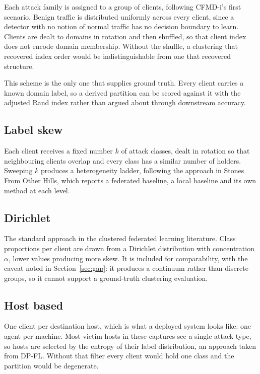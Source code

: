 Each attack family is assigned to a group of clients, following CFMD-i's first
scenario. Benign traffic is distributed uniformly across every client, since a
detector with no notion of normal traffic has no decision boundary to learn.
Clients are dealt to domains in rotation and then shuffled, so that client index
does not encode domain membership. Without the shuffle, a clustering that
recovered index order would be indistinguishable from one that recovered
structure.

This scheme is the only one that supplies ground truth. Every client carries a
known domain label, so a derived partition can be scored against it with the
adjusted Rand index rather than argued about through downstream accuracy.

\subsection{Label skew}

Each client receives a fixed number $k$ of attack classes, dealt in rotation so
that neighbouring clients overlap and every class has a similar number of
holders. Sweeping $k$ produces a heterogeneity ladder, following the approach in
Stones From Other Hills, which reports a federated baseline, a local baseline
and its own method at each level.

\subsection{Dirichlet}

The standard approach in the clustered federated learning literature. Class
proportions per client are drawn from a Dirichlet distribution with
concentration $\alpha$, lower values producing more skew. It is included for
comparability, with the caveat noted in Section~\ref{sec:gap}: it produces a
continuum rather than discrete groups, so it cannot support a ground-truth
clustering evaluation.

\subsection{Host based}

One client per destination host, which is what a deployed system looks like:
one agent per machine. Most victim hosts in these captures see a single attack
type, so hosts are selected by the entropy of their label distribution, an
approach taken from DP-FL. Without that filter every client would hold one
class and the partition would be degenerate.

